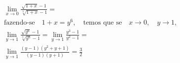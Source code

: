 \begin{ex}
\begin{align}
&\lim_{x\rightarrow 0} \frac{\sqrt{1+x}-1}{\sqrt[3]{1+x}-1}=\nonumber\\
&\text{fazendo-se}\quad 1+x=y^6,\quad\text{temos que se}\quad x\rightarrow 0,\quad y\rightarrow 1,\nonumber\\
&\lim_{y\rightarrow 1} \frac{\sqrt{y^6}-1}{\sqrt[3]{y^6}-1}=\lim_{y\rightarrow 1} \frac{y^3-1}{y^2-1}=\nonumber\\
&\lim_{y\rightarrow 1} \frac{(y-1)(y^2+y+1)}{(y-1)(y+1)}=\frac{3}{2}\nonumber
\end{align}
\end{ex}